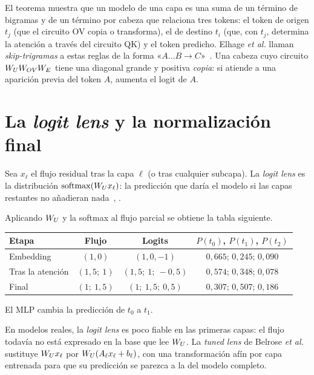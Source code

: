 El teorema muestra que un modelo de una capa es una suma de un término de bigramas y de un término por cabeza que relaciona tres tokens: el token de origen $t_j$ (que el circuito OV copia o transforma), el de destino $t_i$ (que, con $t_j$, determina la atención a través del circuito QK) y el token predicho. Elhage \emph{et al.} llaman \emph{skip-trigramas} a estas reglas de la forma «$A\ldots B\to C$»~\cite[«Interpretation as Skip-Trigrams»]{elhage21}. Una cabeza cuyo circuito $W_{U}W_{OV}W_{E}$ tiene una diagonal grande y positiva \emph{copia}: si atiende a una aparición previa del token $A$, aumenta el logit de $A$.

\section{La \emph{logit lens} y la normalización final}
\label{sec:1-norm}

\begin{definicion}\label{def:lens}
Sea $x_\ell$ el flujo residual tras la capa $\ell$ (o tras cualquier subcapa). La \emph{logit lens} es la distribución $\operatorname{softmax}(W_{U} x_\ell)$: la predicción que daría el modelo si las capas restantes no añadieran nada~\cite{nostalgebraist}, \cite[§10.3]{jm3}.
\end{definicion}

\begin{ejemplo}\label{ej:lens}
Aplicando $W_{U}$ y la softmax al flujo parcial se obtiene la tabla siguiente.
\begin{center}\small
\begin{tabular}{@{}lccc@{}}
\toprule
Etapa & Flujo & Logits & $P(t_0)$, $P(t_1)$, $P(t_2)$ \\
\midrule
Embedding & $(1,0)$ & $(1,0,-1)$ & $0{,}665$; $0{,}245$; $0{,}090$ \\
Tras la atención & $(1{,}5;\allowbreak\ 1)$ & $(1{,}5;\allowbreak\ 1;\allowbreak\ -0{,}5)$ & $0{,}574$; $0{,}348$; $0{,}078$ \\
Final & $(1;\allowbreak\ 1{,}5)$ & $(1;\allowbreak\ 1{,}5;\allowbreak\ 0{,}5)$ & $0{,}307$; $0{,}507$; $0{,}186$ \\
\bottomrule
\end{tabular}
\end{center}
El MLP cambia la predicción de $t_0$ a $t_1$.
\end{ejemplo}

En modelos reales, la \emph{logit lens} es poco fiable en las primeras capas: el flujo todavía no está expresado en la base que lee $W_{U}$. La \emph{tuned lens} de Belrose \emph{et al.}~\cite{belrose} sustituye $W_{U} x_\ell$ por $W_{U}(A_\ell x_\ell+b_\ell)$, con una transformación afín por capa entrenada para que su predicción se parezca a la del modelo completo.

